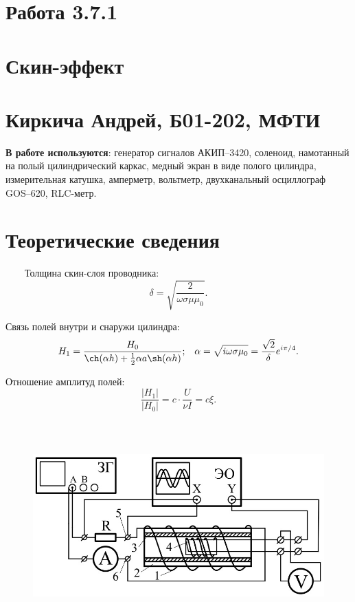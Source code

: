\documentclass[14pt,a4paper]{article}
\begin{document}
\section*{Работа 3.7.1}	
	\section*{Скин-эффект}
    \section*{Киркича Андрей, Б01-202, МФТИ}

\textbf{В работе используются}: генератор сигналов АКИП–3420, соленоид, намотанный на полый цилиндрический каркас, медный экран в виде полого цилиндра, измерительная катушка, амперметр, вольтметр, двухканальный осциллограф GOS–620, RLC-метр.

\section*{Теоретические сведения}

\ \ \ \ Толщина скин-слоя проводника:
\begin{equation}
    \delta = \sqrt{\frac{2}{\omega\sigma\mu\mu_0}}.
    \label{eq:delta}
\end{equation}

Связь полей внутри и снаружи цилиндра:
\begin{equation}
    H_1 = \frac{H_0}{\ch(\alpha h) + \frac{1}{2} \alpha a \sh(\alpha h)} 
    \text{;\ \ \ }
    \alpha = \sqrt{i\omega \sigma \mu_0} = \frac{\sqrt{2}}{\delta}e^{i\pi/4}.
    \label{eq:svyaz_poley}
\end{equation}

Отношение амплитуд полей:
\begin{equation}
    \frac{|H_1|}{|H_0|} = c \cdot \frac{U}{\nu I} = c \xi.
    \label{eq:otnoshenie_amplitud}
\end{equation}

\begin{figure}[h]
    \centering
    \includegraphics[width=17cm, height=8cm]{Pictures/scheme.jpg}
    \label{fig:scheme}
\end{figure}
\end{document}
